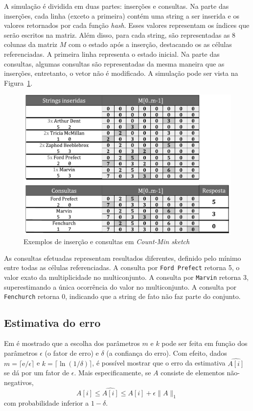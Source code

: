 A simulação é dividida em duas partes: inserções e consultas. Na parte das inserções, cada linha (exceto a primeira) contém uma string a ser inserida e os valores retornados por cada função \emph{hash}. Esses valores representam os índices que serão escritos na matriz. Além disso, para cada string, são representadas as 8 colunas da matriz $M$ com o estado após a inserção, destacando os as células referenciadas. A primeira linha representa o estado inicial. Na parte das consultas, algumas consultas são representadas da mesma maneira que as inserções, entretanto, o vetor não é modificado. A simulação pode ser vista na Figura~\ref{fig:countmin_example}.

\begin{figure}[!htbp]
  \centering
  \includegraphics[scale=0.6]{figures/countmin_example.pdf}
  \caption{Exemplos de inserção e consultas em \emph{Count-Min sketch}}
  \label{fig:countmin_example}
\end{figure}

As consultas efetuadas representam resultados diferentes, definido pelo mínimo entre todas as células referenciadas. A consulta por \texttt{Ford Prefect} retorna 5, o valor exato da multiplicidade no multiconjunto. A consulta por \texttt{Marvin} retorna 3, superestimando a única ocorrência do valor no multiconjunto. A consulta por \texttt{Fenchurch} retorna 0, indicando que a string de fato não faz parte do conjunto.

\subsection{Estimativa do erro}

Em \cite{cormode2005improved} é mostrado que a escolha dos parâmetros $m$ e $k$ pode ser feita em função dos parâmetros $\epsilon$ (o fator de erro) e $\delta$ (a confiança do erro). Com efeito, dados $m = \lceil \mathrm{e}/\epsilon \rceil$ e $k = \lceil \ln(1/\delta) \rceil$, é possível mostrar que o erro da estimativa $\widehat{A[i]}$ se dá por um fator de $\epsilon$. Mais especificamente, se $A$ consiste de elementos não-negativos,
\[
A[i] \leq \widehat{A[i]} \leq A[i] + \epsilon \lVert A \rVert_1
\]
com probabilidade inferior a $1 - \delta$.

